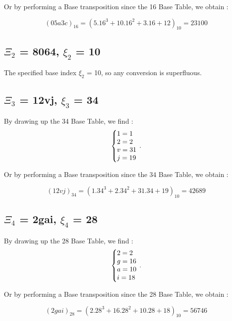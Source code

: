 \documentclass[letterpaper,10pt,english]{sphinxmanual}
\begin{document}
\begin{flushleft}
  Or by performing a Base transposition since the 16 Base Table, we obtain :
\end{flushleft}
\begin{equation}
(05a3c)_{16}=(5.16^{3}+10.16^{2}+3.16+12)_{10}=23100
\end{equation}

\subsection{$\Xi_{2}$ = 8064, $\xi_{2}$ = 10}
The specified base index $\xi_{2}$ = 10, so any conversion is superfluous.


\subsection{$\Xi_{3}$ = 12vj, $\xi_{3}$ = 34}
By drawing up the 34 Base Table, we find :
\begin{equation}
\centering
\left\{\begin{array}{@{}l@{}}
1=1 \\
2=2 \\
v=31 \\
j=19 \\
\end{array}\right.\,.
\end{equation}

\begin{flushleft}
  Or by performing a Base transposition since the 34 Base Table, we obtain :
\end{flushleft}
\begin{equation}
(12vj)_{34}=(1.34^{3}+2.34^{2}+31.34+19)_{10}=42689
\end{equation}

\subsection{$\Xi_{4}$ = 2gai, $\xi_{4}$ = 28}
By drawing up the 28 Base Table, we find :
\begin{equation}
\centering
\left\{\begin{array}{@{}l@{}}
2=2 \\
g=16 \\
a=10 \\
i=18 \\
\end{array}\right.\,.
\end{equation}

\begin{flushleft}
  Or by performing a Base transposition since the 28 Base Table, we obtain :
\end{flushleft}
\begin{equation}
(2gai)_{28}=(2.28^{3}+16.28^{2}+10.28+18)_{10}=56746
\end{equation}
\end{document}
